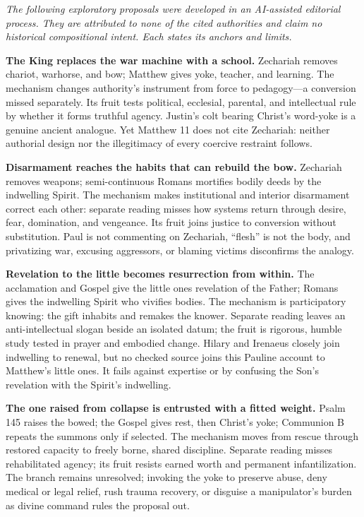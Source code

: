 \begin{deepstudy}
\noindent\emph{The following exploratory proposals were developed in an AI-assisted editorial process. They are attributed to none of the cited authorities and claim no historical compositional intent. Each states its anchors and limits.}

\noindent\textbf{The King replaces the war machine with a school.\enspace{}}
Zechariah removes chariot, warhorse, and bow; Matthew gives yoke, teacher, and learning. The mechanism changes authority's instrument from force to pedagogy---a conversion missed separately. Its fruit tests political, ecclesial, parental, and intellectual rule by whether it forms truthful agency. Justin's colt bearing Christ's word-yoke is a genuine ancient analogue. Yet Matthew 11 does not cite Zechariah: neither authorial design nor the illegitimacy of every coercive restraint follows.

\noindent\textbf{Disarmament reaches the habits that can rebuild the bow.\enspace{}}
Zechariah removes weapons; semi-continuous Romans mortifies bodily deeds by the indwelling Spirit. The mechanism makes institutional and interior disarmament correct each other: separate reading misses how systems return through desire, fear, domination, and vengeance. Its fruit joins justice to conversion without substitution. Paul is not commenting on Zechariah, “flesh” is not the body, and privatizing war, excusing aggressors, or blaming victims disconfirms the analogy.

\noindent\textbf{Revelation to the little becomes resurrection from within.\enspace{}}
The acclamation and Gospel give the little ones revelation of the Father; Romans gives the indwelling Spirit who vivifies bodies. The mechanism is participatory knowing: the gift inhabits and remakes the knower. Separate reading leaves an anti-intellectual slogan beside an isolated datum; the fruit is rigorous, humble study tested in prayer and embodied change. Hilary and Irenaeus closely join indwelling to renewal, but no checked source joins this Pauline account to Matthew's little ones. It fails against expertise or by confusing the Son's revelation with the Spirit's indwelling.

\noindent\textbf{The one raised from collapse is entrusted with a fitted weight.\enspace{}}
Psalm 145 raises the bowed; the Gospel gives rest, then Christ's yoke; Communion B repeats the summons only if selected. The mechanism moves from rescue through restored capacity to freely borne, shared discipline. Separate reading misses rehabilitated agency; its fruit resists earned worth and permanent infantilization. The branch remains unresolved; invoking the yoke to preserve abuse, deny medical or legal relief, rush trauma recovery, or disguise a manipulator's burden as divine command rules the proposal out.


\end{deepstudy}
